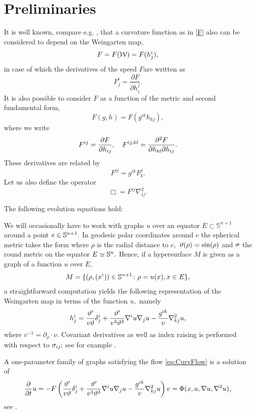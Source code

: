 \documentclass{amsart}
\begin{document}
\section{Preliminaries}\label{prelim}
\label{sec:prelim}
It is well known, compare e.g. \cite[Ch.~2]{Gerhardt:/2006}, that a curvature function as in \cref{F} also can be considered to depend on the Weingarten map,
\[F=F(\mc{W})=F(h^i_j),\]
in case of which the derivatives of the speed \(F\)are written as
\[
F^{i}_{j} = \frac{\partial F}{\partial h^{j}_{i}}.
\]
It is also possible to consider $F$ as a function of the metric and second fundamental form,
\[
F(g, h) = F(g^{ik} h_{kj}),
\]
where we write
\[
F^{ij} = \frac{\partial F}{\partial h_{ij}}, \quad F^{ij,kl} = \fr{\partial^2F}{\partial h_{kl} \partial h_{ij}}.
\]
These derivatives are related by
\[F^{ij}=g^{ik}F^j_k.\]
Let us also define the operator
\[
\Box = F^{ij} \nabla^2_{ij}.
\]
\begin{lemma} \label{lem: basi ev}
The following evolution equations hold:
\end{lemma}

We will occasionally have to work with graphs \(u\) over an equator $E \subset \mathbb{S}^{n+1}$ around a point $e\in\S^{n+1}.$ In geodesic polar coordinates around $e$ the spherical metric takes the form
where $\rho$ is the radial distance to $e,$ $\vt(\rho)=\sin(\rho)$ and $\s$ the round metric on the equator $E\simeq \S^n.$ Hence, if a hypersurface $M$ is given as a graph of a function $u$ over $E$,
\[M=\{(\rho,(x^i))\in \S^{n+1}\cn \rho=u(x), x\in E\},\]
a straightforward computation yields the following representation of the Weingarten map in terms of the function $u,$ namely
$$\label{graph h}h^i_j=\fr{\vt'}{v\vt}\d^i_j+\fr{\vt'}{v^3\vt^3}\nabla^iu\nabla_ju-\fr{g^{ik}}{v}\nabla^2_{kj}u,$$
where $v^{-1} = \partial_\rho \cdot \nu.$ Covariant derivatives as well as index raising is performed with respect to $\s_{ij};$ see for example \cite[(3.82)]{Scheuer:05/2015}.

A one-parameter family of graphs satisfying the flow \eqref{eq:CurvFlow} is a solution of
\begin{equation}
\label{eq:GraphCurvFlow}
\fr{\del}{\del t}u=-F\br{\fr{\vt'}{v\vt}\d^{i}_{j}+\fr{\vt'}{v^{3}\vt^{3}}\nabla^{i}u\nabla_{j}u-\fr{g^{ik}}{v}\nabla^{2}_{kj}u}v=\Phi(x,u,\nabla u,\nabla^{2}u),
\end{equation}
see \cite[p.~98-99]{Gerhardt:/2006}.
\end{document}
